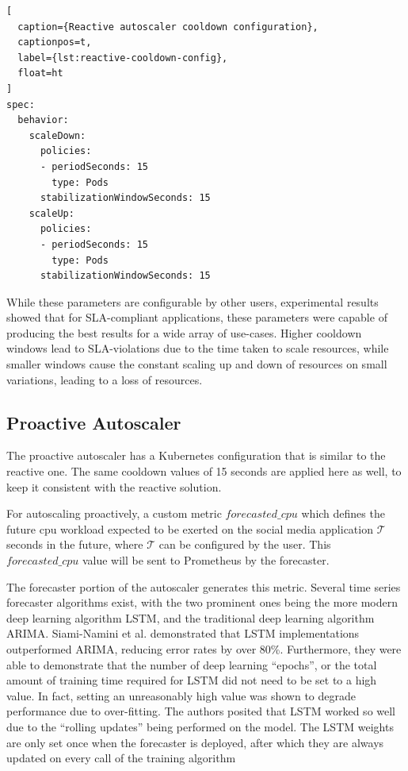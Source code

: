 \begin{lstlisting}[
  caption={Reactive autoscaler cooldown configuration},
  captionpos=t,
  label={lst:reactive-cooldown-config},
  float=ht
]
spec:
  behavior:
    scaleDown:
      policies:
      - periodSeconds: 15
        type: Pods
      stabilizationWindowSeconds: 15
    scaleUp:
      policies:
      - periodSeconds: 15
        type: Pods
      stabilizationWindowSeconds: 15
\end{lstlisting}

While these parameters are configurable by other users, experimental results showed that for SLA-compliant applications, these parameters were capable of producing the best results for a wide array of use-cases. Higher cooldown windows lead to SLA-violations due to the time taken to scale resources, while smaller windows cause the constant scaling up and down of resources on small variations, leading to a loss of resources.

\subsection{Proactive Autoscaler}
\label{subsec:proactive-auto-subsection}

The proactive autoscaler has a Kubernetes configuration that is similar to the reactive one. The same cooldown values of 15 seconds are applied here as well, to keep it consistent with the reactive solution.\par

For autoscaling proactively, a custom metric $forecasted\_cpu$ which defines the future cpu workload expected to be exerted on the social media application $\mathcal{T}$ seconds in the future, where $\mathcal{T}$ can be configured by the user. This $forecasted\_cpu$ value will be sent to Prometheus by the forecaster.

The forecaster portion of the autoscaler generates this metric. Several time series forecaster algorithms exist, with the two prominent ones being the more modern deep learning algorithm LSTM, and the traditional deep learning algorithm ARIMA. Siami-Namini et al. \cite{siami2018comparison} demonstrated that LSTM implementations outperformed ARIMA, reducing error rates by over 80\%. Furthermore, they were able to demonstrate that the number of deep learning ``epochs'', or the total amount of training time required for LSTM did not need to be set to a high value. In fact, setting an unreasonably high value was shown to degrade performance due to over-fitting. The authors posited that LSTM worked so well due to the ``rolling updates'' being performed on the model. The LSTM weights are only set once when the forecaster is deployed, after which they are always updated on every call of the training algorithm\par

